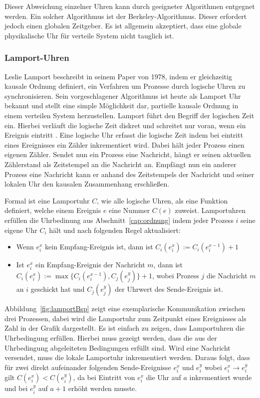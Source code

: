 Dieser Abweichung einzelner Uhren kann durch geeigneter Algorithmen entgegnet werden.
Ein solcher Algorithmus ist der Berkeley-Algorithmus. Dieser erfordert jedoch einen globalen Zeitgeber.
Es ist allgemein akzeptiert, dass eine globale physikalische Uhr für verteile System nicht tauglich ist. %

\subsubsection{Lamport-Uhren}
\label{cap:vectorclock}
Leslie Lamport beschreibt in seinem Paper \cite{Lamport1978} von 1978, indem er gleichzeitig kausale Ordnung definiert, ein Verfahren um Prozesse durch logische Uhren zu synchronisieren.
Sein vorgeschlagener Algorithmus ist heute als Lamport Uhr bekannt und stellt eine simple Möglichkeit dar, partielle kausale Ordnung in einem verteilen System herzustellen.
Lamport führt den Begriff der logischen Zeit ein.
Hierbei verläuft die logische Zeit diskret und schreitet nur voran, wenn ein Ereignis eintritt \cite{leon2013ereignisdiskrete}.
Eine logische Uhr erfasst die logische Zeit indem bei eintritt eines Ereignisses ein Zähler inkrementiert wird.
Dabei hält jeder Prozess einen eigenen Zähler.
Sendet nun ein Prozess eine Nachricht, hängt er seinen aktuellen Zählerstand als Zeitstempel an die Nachricht an.
Empfängt nun ein anderer Prozess eine Nachricht kann er anhand des Zeitstempels der Nachricht und seiner lokalen Uhr den kausalen Zusammenhang erschließen.

Formal ist eine Lamportuhr $C$, wie alle logische Uhren, als eine Funktion definiert, welche einem Ereignis $e$ eine Nummer $C(e)$ zuweist.
Lamportuhren erfüllen die Uhrbedinung aus Abschnitt~\ref{cap:ordnung} indem jeder Prozess $i$ seine eigene Uhr $C_i$ hält und nach folgenden Regel aktualisiert:
\begin{itemize}
    \item Wenn $e_i^x$ kein Empfang-Ereignis ist, dann ist $C_i(e_i^x):=C_i(e_i^{x-1})+1$
    \item Ist $e_i^x$ ein Empfang-Ereignis der Nachricht $m$, dann ist $C_i(e_i^x):=\max\{C_i(e_i^{x-1}), C_j(e_j^y)  \} + 1$, wobei Prozess $j$ die Nachricht $m$ an $i$ geschickt hat und $C_j(e_j^y)$ der Uhrwert des Sende-Ereignis ist.
\end{itemize}

Abbildung~\ref{fig:lamportBsp} zeigt eine exemplarische Kommunikation zwischen drei Prozessen, dabei wird die Lamportuhr zum Zeitpunkt eines Ereignisses als Zahl in der Grafik dargestellt.
Es ist einfach zu zeigen, dass Lamportuhren die Uhrbedingung erfüllen.
Hierbei muss gezeigt werden, dass die aus der Uhrbedingung abgeleiteten Bedingungen erfüllt sind.
Wird eine Nachricht versendet, muss die lokale Lamportuhr inkrementiert werden. 
Daraus folgt, dass für zwei direkt aufeinander folgenden Sende-Ereignisse $e_i^x$ und $e_i^y$ wobei $e_i^x \rightarrow e_i^y$ gilt $C(e_i^x) < C(e_i^y)$, da bei Eintritt von $e_i^x$ die Uhr auf $a$ inkrementiert wurde und bei $e_i^y$ auf $a + 1$ erhöht werden musste.

